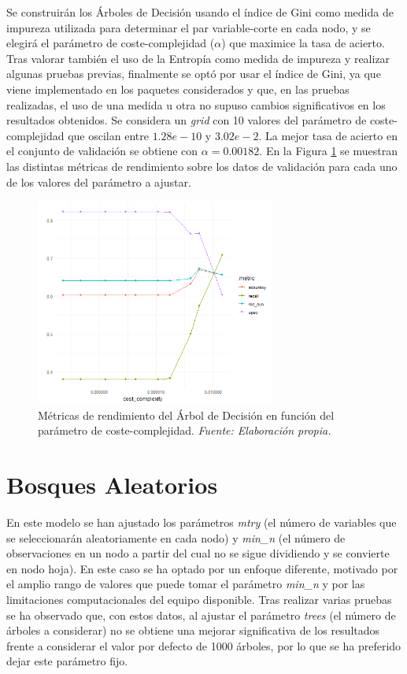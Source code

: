 \documentclass[12pt,a4paper,]{book}
\numberwithin{dummy}{section}
\theoremstyle{ocrenumbox}
\theoremstyle{blacknumex}
\theoremstyle{blacknumbox}
\theoremstyle{ocrenum}
\theoremstyle{ocrenum}
\begin{document}
Se construirán los Árboles de Decisión usando el índice de Gini como
medida de impureza utilizada para determinar el par variable-corte en
cada nodo, y se elegirá el parámetro de coste-complejidad (\(\alpha\))
que maximice la tasa de acierto. Tras valorar también el uso de la
Entropía como medida de impureza y realizar algunas pruebas previas,
finalmente se optó por usar el índice de Gini, ya que viene implementado
en los paquetes considerados y que, en las pruebas realizadas, el uso de
una medida u otra no supuso cambios significativos en los resultados
obtenidos. Se considera un \emph{grid} con 10 valores del parámetro de
coste-complejidad que oscilan entre \(1.28e-10\) y \(3.02e- 2\). La
mejor tasa de acierto en el conjunto de validación se obtiene con
\(\alpha = 0.00182\). En la Figura \ref{fig:dt_tuningplot} se muestran
las distintas métricas de rendimiento sobre los datos de validación para
cada uno de los valores del parámetro a ajustar.

\begin{figure}[h!]
\centering
\includegraphics[width =0.7\textwidth]{graficos/dt_tuningplot.png}
\caption[Métricas de rendimiento del Árbol de Decisión en función de $\alpha$]{Métricas de rendimiento del Árbol de Decisión en función del parámetro de coste-complejidad. \it Fuente: Elaboración propia.}
\label{fig:dt_tuningplot}
\end{figure}

\hypertarget{bosques-aleatorios}{%
\section{Bosques Aleatorios}\label{bosques-aleatorios}}

En este modelo se han ajustado los parámetros \emph{mtry} (el número de
variables que se seleccionarán aleatoriamente en cada nodo) y
\emph{min\_n} (el número de observaciones en un nodo a partir del cual
no se sigue dividiendo y se convierte en nodo hoja). En este caso se ha
optado por un enfoque diferente, motivado por el amplio rango de valores
que puede tomar el parámetro \emph{min\_n} y por las limitaciones
computacionales del equipo disponible. Tras realizar varias pruebas se
ha observado que, con estos datos, al ajustar el parámetro \emph{trees}
(el número de árboles a considerar) no se obtiene una mejorar
significativa de los resultados frente a considerar el valor por defecto
de 1000 árboles, por lo que se ha preferido dejar este parámetro fijo.
\end{document}
